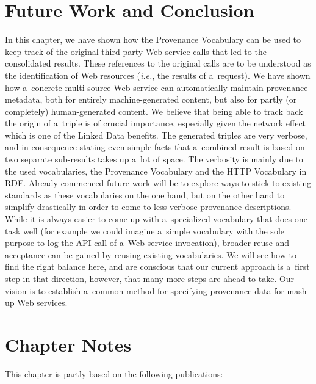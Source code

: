 \section{Future Work and Conclusion}                                                        
\label{sec:conclusion}
In this chapter, we have shown how the Provenance
Vocabulary can be used to keep track of the original third party Web service calls that led to the consolidated
results. These references to the original calls are to be understood as the identification of Web resources (\emph{i.e.}, the
results of a~request). We have shown how a~concrete multi-source Web service can automatically maintain provenance
metadata, both for entirely machine-generated content, but also for partly (or completely) human-generated content. We
believe that being able to track back the origin of a~triple is of crucial importance, especially given the network
effect which is one of the Linked Data benefits. The generated triples are very verbose, and in consequence stating even simple facts that a~combined result is based on two separate sub-results takes up a~lot of space. The verbosity is mainly due to the used vocabularies, the Provenance Vocabulary and the HTTP Vocabulary in RDF.
Already commenced future work will be to explore ways to stick to existing standards as these vocabularies on the one hand, but on the other hand to simplify drastically in order to come to less verbose provenance descriptions. While it is always easier to come up with a~specialized vocabulary that does one task well (for example we could imagine a~simple vocabulary with the sole purpose to log the API call of a~Web service invocation), broader reuse and acceptance can be gained by reusing existing vocabularies. We will see how to find the right balance here, and are conscious that our current approach is a~first step in that direction, however, that many more steps are ahead to take. Our vision is to establish a~common method for specifying provenance data for mash-up Web services. 

\section*{Chapter Notes}
This chapter is partly based on the following publications:
